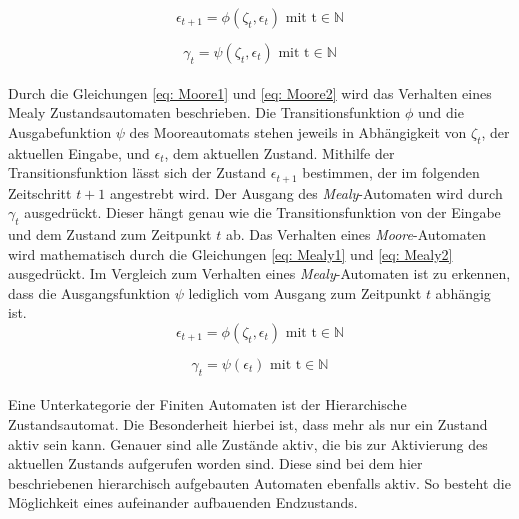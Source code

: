 	\begin{equation}
		\epsilon_{t+1}=\phi(\zeta_t,\epsilon_t)\text{    mit    t}\in\mathbb{N}
		\label{eq: Moore1}
	\end{equation}

	\begin{equation}
		\gamma_t=\psi(\zeta_t,\epsilon_t)\text{    mit    t}\in\mathbb{N}
		\label{eq: Moore2}
	\end{equation}
	\\
	Durch die Gleichungen \ref{eq: Moore1} und \ref{eq: Moore2} wird das Verhalten eines Mealy Zustandsautomaten beschrieben. Die Transitionsfunktion $\phi$ und die Ausgabefunktion $\psi$ des Mooreautomats stehen jeweils in Abhängigkeit von $\zeta_t $, der aktuellen Eingabe, und $\epsilon_t$, dem aktuellen Zustand. Mithilfe der Transitionsfunktion lässt sich der Zustand $\epsilon_{t+1}$ bestimmen, der im folgenden Zeitschritt $t+1$ angestrebt wird. Der Ausgang des \textit{Mealy}-Automaten wird durch $\gamma_t$ ausgedrückt. Dieser hängt genau wie die Transitionsfunktion von der Eingabe und dem Zustand zum Zeitpunkt $t$ ab. Das Verhalten eines \textit{Moore}-Automaten wird mathematisch durch die Gleichungen \ref{eq: Mealy1} und \ref{eq: Mealy2} ausgedrückt. Im Vergleich zum Verhalten eines \textit{Mealy}-Automaten ist zu erkennen, dass die Ausgangsfunktion $\psi$ lediglich vom Ausgang zum Zeitpunkt $t$ abhängig ist.  \cite{mooremealy}\\
	
	\begin{equation}
		\epsilon_{t+1}=\phi(\zeta_t,\epsilon_t)\text{    mit    t}\in\mathbb{N}
		\label{eq: Mealy1}
	\end{equation}
	
	\begin{equation}
		\gamma_t=\psi(\epsilon_t)\text{    mit    t}\in\mathbb{N}
		\label{eq: Mealy2}
	\end{equation}
	\\
	
	
	Eine Unterkategorie der Finiten Automaten ist der Hierarchische Zustandsautomat. Die Besonderheit hierbei ist, dass mehr als nur ein Zustand aktiv sein kann. Genauer sind alle Zustände aktiv, die bis zur Aktivierung des aktuellen Zustands aufgerufen worden sind. Diese sind bei dem hier beschriebenen hierarchisch aufgebauten Automaten ebenfalls aktiv. So besteht die Möglichkeit eines aufeinander aufbauenden Endzustands. \cite{hsm}
	
	
		
	\newpage	

